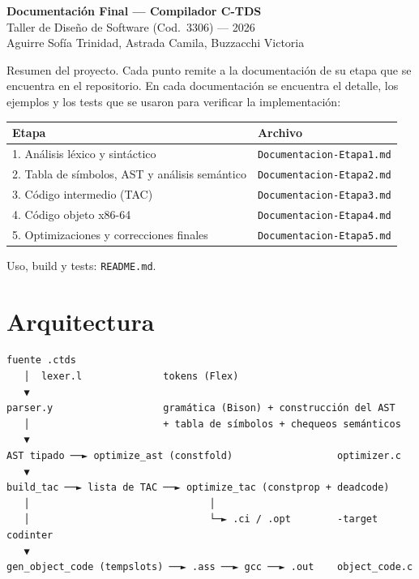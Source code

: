 \documentclass[11pt,a4paper]{article}
\newcommand{\code}[1]{\texttt{#1}}
\begin{document}
\begin{center}
  {\LARGE\bfseries Documentación Final --- Compilador C-TDS}\\[4pt]
  Taller de Diseño de Software (Cod.\ 3306) --- 2026 \\[4pt]
  Aguirre Sofía Trinidad, Astrada Camila, Buzzacchi Victoria
\end{center}

Resumen del proyecto. Cada punto remite a la documentación de su etapa que se encuentra en el repositorio. En cada documentación se encuentra el
 detalle, los ejemplos y los tests que se usaron para verificar la implementación:

\begin{tabularx}{\textwidth}{Ll}
\toprule
\textbf{Etapa} & \textbf{Archivo} \\
. Análisis léxico y sintáctico & \code{Documentacion-Etapa1.md} \\
2. Tabla de símbolos, AST y análisis semántico & \code{Documentacion-Etapa2.md} \\
3. Código intermedio (TAC) & \code{Documentacion-Etapa3.md} \\
4. Código objeto x86-64 & \code{Documentacion-Etapa4.md} \\
5. Optimizaciones y correcciones finales & \code{Documentacion-Etapa5.md} \\
\bottomrule
\end{tabularx}

Uso, build y tests: \code{README.md}.

\section*{Arquitectura}

\begin{Verbatim}[fontsize=\small,frame=single,framesep=6pt]
fuente .ctds
   │  lexer.l              tokens (Flex)
   ▼
parser.y                   gramática (Bison) + construcción del AST
   │                       + tabla de símbolos + chequeos semánticos
   ▼
AST tipado ──► optimize_ast (constfold)                  optimizer.c
   ▼
build_tac ──► lista de TAC ──► optimize_tac (constprop + deadcode)
   │                               │
   │                               └─► .ci / .opt        -target codinter
   ▼
gen_object_code (tempslots) ──► .ass ──► gcc ──► .out    object_code.c
\end{Verbatim}
\end{document}

